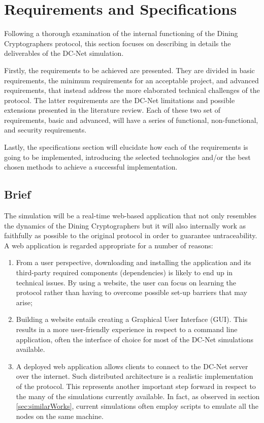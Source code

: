 \chapter{Requirements and Specifications}

Following a thorough examination of the internal functioning of the Dining Cryptographers protocol, this section focuses on describing in details the deliverables of the DC-Net simulation. 

Firstly, the requirements to be achieved are presented. They are divided in basic requirements, the minimum requirements for an acceptable project, and advanced requirements, that instead address the more elaborated technical challenges of the protocol. The latter requirements are the DC-Net limitations and possible extensions presented in the literature review. Each of these two set of requirements, basic and advanced, will have a series of functional, non-functional, and security requirements. 

Lastly, the specifications section will elucidate how each of the requirements is going to be implemented, introducing the selected technologies and/or the best chosen methods to achieve a successful implementation.

\section{Brief}
The simulation will be a real-time web-based application that not only resembles the dynamics of the Dining Cryptographers but it will also internally work as faithfully as possible to the original protocol in order to guarantee untraceability. A web application is regarded appropriate for a number of reasons:
\begin{enumerate}
    \item From a user perspective, downloading and installing the application and its third-party required components (dependencies) is likely to end up in technical issues. By using a website, the user can focus on learning the protocol rather than having to overcome possible set-up barriers that may arise;
    \item Building a website entails creating a Graphical User Interface (GUI). This results in a more user-friendly experience in respect to a command line application, often the interface of choice for most of the DC-Net simulations available.
    \item A deployed web application allows clients to connect to the DC-Net server over the internet. Such distributed architecture is a realistic implementation of the protocol. This represents another important step forward in respect to the many of the simulations currently available. In fact, as observed in section \ref{sec:similarWorks}, current simulations often employ scripts to emulate all the nodes on the same machine.
\end{enumerate}

